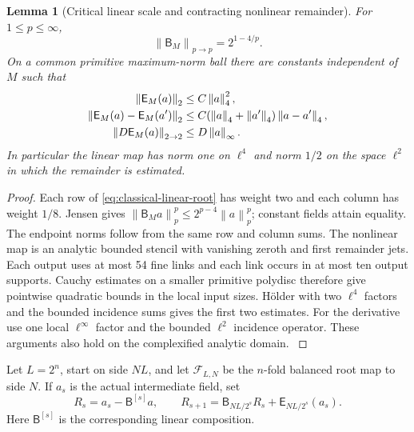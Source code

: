 \documentclass[11pt,oneside,openany]{book}
\newtheorem{lemma}[lemma]{Lemma}
\theoremstyle{definition}
\theoremstyle{remark}
\newcommand{\norm}[1]{\left\lVert#1\right\rVert}
\newcommand{\src}[2]{\cite[#2]{#1}}
\begin{document}
\begin{lemma}[Critical linear scale and contracting nonlinear remainder]
\label{lem:classical-two-norm}
For $1\le p\le\infty$,
\begin{equation}
 \norm{\mathsf B_M}_{p\to p}=2^{1-4/p}.
 \label{eq:classical-block-norm}
\end{equation}
On a common primitive maximum-norm ball there are constants independent
of $M$ such that
\begin{align}
 \norm{\mathsf E_M(a)}_2&\le C\norm a_4^2,\notag\\
 \norm{\mathsf E_M(a)-\mathsf E_M(a')}_2
    &\le C(\norm a_4+\norm{a'}_4)\norm{a-a'}_4,\notag\\
 \norm{D\mathsf E_M(a)}_{2\to2}&\le D\norm a_\infty.
 \label{eq:classical-root-remainder}
\end{align}
In particular the linear map has norm one on $\ell^4$ and norm
$1/2$ on the space $\ell^2$ in which the remainder is estimated.
\end{lemma}
\begin{proof}
Each row of \cref{eq:classical-linear-root} has weight two and each
column has weight $1/8$. Jensen gives
$\norm{\mathsf B_Ma}_p^p\le2^{p-4}\norm a_p^p$; constant fields
attain equality. The endpoint norms follow from the same row and
column sums. The nonlinear map is an analytic bounded stencil with
vanishing zeroth and first remainder jets. Each output uses at most
54 fine links and each link occurs in at most ten output supports.
Cauchy estimates on a smaller primitive polydisc therefore give
pointwise quadratic bounds in the local input sizes. H\"older with
two $\ell^4$ factors and the bounded incidence sums gives the first
two estimates. For the derivative use one local $\ell^\infty$
factor and the bounded $\ell^2$ incidence operator. These arguments
also hold on the complexified analytic domain. \src{SM}{V10, V12--V13}
\end{proof}

Let $L=2^n$, start on side $NL$, and let $\mathcal F_{L,N}$ be the
$n$-fold balanced root map to side $N$. If $a_s$ is the actual
intermediate field, set
\[
 R_s=a_s-\mathsf B^{[s]}a,
 \qquad R_{s+1}=\mathsf B_{NL/2^s}R_s+\mathsf E_{NL/2^s}(a_s).
\]
Here $\mathsf B^{[s]}$ is the corresponding linear composition.
\end{document}

